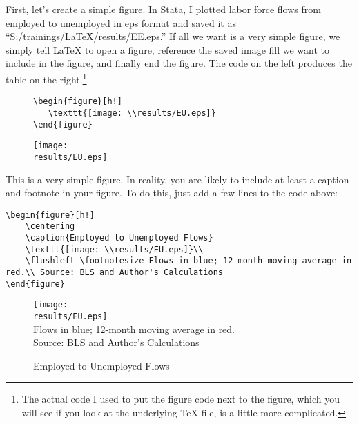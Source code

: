 \documentclass[11pt]{article}
\def\results{S:/trainings/LaTeX/results}
\begin{document}
First, let's create a simple figure. In Stata, I plotted labor force flows from employed to unemployed in eps format and saved it as ``S:/trainings/LaTeX/results/EE.eps.'' If all we want is a very simple figure, we simply tell \LaTeX{} to open a figure, reference the saved image fill we want to include in the figure, and finally end the figure. The code on the left produces the table on the right.\footnote{The actual code I used to put the figure code next to the figure, which you will see if you look at the underlying \TeX{} file, is a little more complicated.}

\begin{figure}[h!]
    \begin{minipage}[c]{.45\textwidth}
        \centering
        \begin{verbatim}
\begin{figure}[h!]
   \texttt{[image: \\results/EU.eps]}
\end{figure}
        \end{verbatim}
    \end{minipage}
    \begin{minipage}[c]{.45\textwidth}
        \centering
        \texttt{[image: \\results/EU.eps]}
    \end{minipage}
\end{figure}

This is a very simple figure. In reality, you are likely to include at least a caption and footnote in your figure. To do this, just add a few lines to the code above:
\begin{verbatim}
\begin{figure}[h!]
    \centering
    \caption{Employed to Unemployed Flows}
    \texttt{[image: \\results/EU.eps]}\\
    \flushleft \footnotesize Flows in blue; 12-month moving average in red.\\ Source: BLS and Author's Calculations
\end{figure}
\end{verbatim}


\begin{figure}[h!]
        \centering
        \caption{Employed to Unemployed Flows}
        \texttt{[image: \\results/EU.eps]}\\
        \flushleft \footnotesize Flows in blue; 12-month moving average in red.\\ Source: BLS and Author's Calculations
\end{figure}
\end{document}
